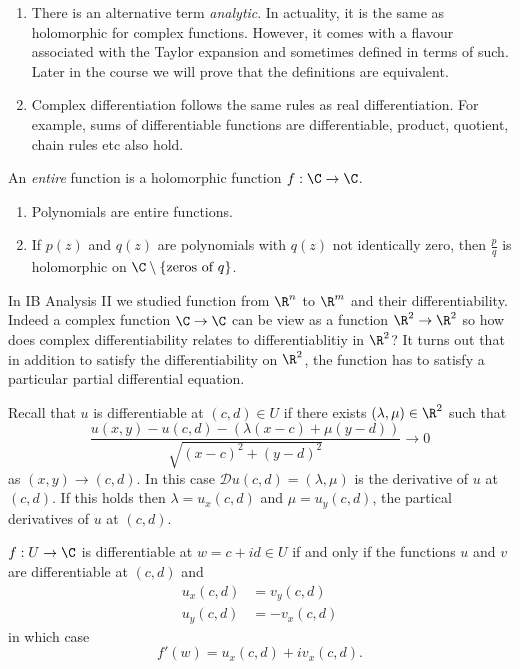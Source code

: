 \documentclass[a4paper]{article}
\newcommand*{\D}{\mathcal{D}}
\begin{document}
\begin{remark}\leavevmode
  \begin{enumerate}
  \item There is an alternative term \emph{analytic}. In actuality, it is the same as holomorphic for complex functions. However, it comes with a flavour associated with the Taylor expansion and sometimes defined in terms of such. Later in the course we will prove that the definitions are equivalent.
  \item Complex differentiation follows the same rules as real differentiation. For example, sums of differentiable functions are differentiable, product, quotient, chain rules etc also hold.
  \end{enumerate}
\end{remark}

\begin{definition}[Entire]
  An \emph{entire} function is a holomorphic function \(f: \C \to \C\).
\end{definition}

\begin{eg}\leavevmode
  \begin{enumerate}
  \item Polynomials are entire functions.
  \item If \(p(z)\) and \(q(z)\) are polynomials with \(q(z)\) not identically zero, then \(\frac{p}{q}\) is holomorphic on \(\C \setminus \{\text{zeros of } q\}\).
  \end{enumerate}
\end{eg}

In IB Analysis II we studied function from \(\R^n\) to \(\R^m\) and their differentiability. Indeed a complex function \(\C \to \C\) can be view as a function \(\R^2 \to \R^2\) so how does complex differentiability relates to differentiablitiy in \(\R^2\)? It turns out that in addition to satisfy the differentiability on \(\R^2\), the function has to satisfy a particular partial differential equation.

Recall that \(u\) is differentiable at \((c, d) \in U\) if there exists \((\lambda, \mu) \in \R^2\) such that
\[
  \frac{u(x, y) - u(c, d) - (\lambda(x - c) + \mu(y -d))}{\sqrt{(x - c)^2 + (y - d)^2}} \to 0
\]
as \((x, y) \to (c, d)\). In this case \(\D u(c, d) = (\lambda, \mu)\) is the derivative of \(u\) at \((c, d)\). If this holds then \(\lambda = u_x(c, d)\) and \(\mu = u_y(c, d)\), the partical derivatives of \(u\) at \((c, d)\).

\begin{theorem}
  \(f: U \to \C\) is differentiable at \(w = c + id \in U\) if and only if the functions \(u\) and \(v\) are differentiable at \((c, d)\) and
  \begin{align*}
    u_x(c, d) &= v_y(c, d) \\
    u_y(c, d) &= -v_x(c, d)
  \end{align*}
  in which case
  \[
    f'(w) = u_x(c, d) + iv_x(c, d).
  \]
\end{theorem}
\end{document}
